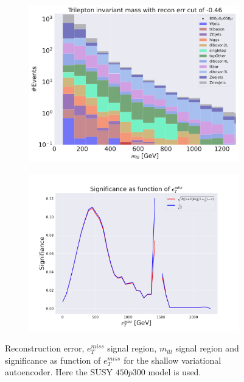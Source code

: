\begin{figure}[H]
    \hfill
    \begin{subfigure}{.49\textwidth}
        \includegraphics[width=\textwidth]{Figures/VAE_testing/small/3lep/b_data_recon_big_rm3_feats_sig_800p0p050p_mlll_recon_errcut_-0.46.pdf}
        \caption{}
        \label{fig:VAE_3lep_small_mlll_800_3}
    \end{subfigure}
    \hfill   
    \begin{subfigure}{.49\textwidth}
        \includegraphics[width=\textwidth]{Figures/VAE_testing/small/3lep/significance_etmiss_800p0p050p_-0.4571280959445052.pdf}
        \caption{}
        \label{fig:VAE_3lep_small_signi_800_3}
    \end{subfigure}
    \hfill      
    \caption[3lep shallow network | $800p50$ | VAE | 3]{Reconstruction error, $e_T^{miss}$ signal region, $m_{lll}$ signal region and significance as function of 
    $e_T^{miss}$ for the shallow variational autoencoder. Here the SUSY $450p300$ model is used.}
    \label{fig:VAE_3lep_small_rec_sig_signi_800_3}
\end{figure}

